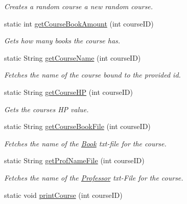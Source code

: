 \begin{DoxyCompactItemize}
\begin{DoxyCompactList}\small\item\em Creates a random course  a new random course. \end{DoxyCompactList}\item 
static int \hyperlink{classTXTReader_aa50e32bac584af6a1cd909c15261d313}{get\+Course\+Book\+Amount} (int course\+I\+D)
\begin{DoxyCompactList}\small\item\em Gets how many books the course has. \end{DoxyCompactList}\item 
static String \hyperlink{classTXTReader_a11d27a0cb164ad919af7ce311e891979}{get\+Course\+Name} (int course\+I\+D)
\begin{DoxyCompactList}\small\item\em Fetches the name of the course bound to the provided id. \end{DoxyCompactList}\item 
static String \hyperlink{classTXTReader_ac3d0b99bc3ead4160cc94d3a418b3097}{get\+Course\+H\+P} (int course\+I\+D)
\begin{DoxyCompactList}\small\item\em Gets the courses H\+P value. \end{DoxyCompactList}\item 
static String \hyperlink{classTXTReader_aa0408f4283bdcb82f45a2147fb38faac}{get\+Course\+Book\+File} (int course\+I\+D)
\begin{DoxyCompactList}\small\item\em Fetches the name of the \hyperlink{classBook}{Book} txt-\/file for the course. \end{DoxyCompactList}\item 
static String \hyperlink{classTXTReader_a420d2835e023f7f0d854a7b64abe6995}{get\+Prof\+Name\+File} (int course\+I\+D)
\begin{DoxyCompactList}\small\item\em Fetches the name of the \hyperlink{classProfessor}{Professor} txt-\/\+File for the course. \end{DoxyCompactList}\item 
\hypertarget{classTXTReader_a75d2e79aa94ebe63749d7806dcf9aa60}{}static void \hyperlink{classTXTReader_a75d2e79aa94ebe63749d7806dcf9aa60}{print\+Course} (int course\+I\+D)\label{classTXTReader_a75d2e79aa94ebe63749d7806dcf9aa60}


\end{DoxyCompactItemize}
